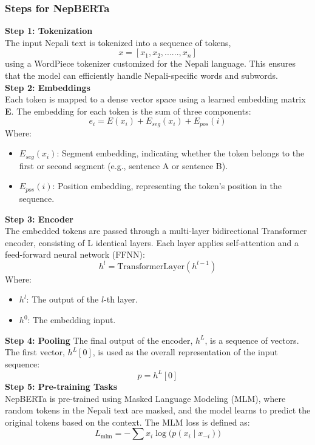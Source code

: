 \subsubsection{Steps for NepBERTa}
\textbf{Step 1: Tokenization}\\
The input Nepali text is tokenized into a sequence of tokens,\begin{equation}
x = [x_1, x_2,......, x_n]
\end{equation}
using a WordPiece tokenizer customized for the Nepali language. This ensures that the model can efficiently handle Nepali-specific words and subwords.\\
\textbf{Step 2: Embeddings}\\
Each token is mapped to a dense vector space using a learned embedding matrix \textbf{E}. The embedding for each token is the sum of three components:
\begin{equation}
e_i = E(x_i) + E_{seg}(x_i) + E_{pos}(i)
\end{equation}
Where:\begin{itemize}
\item \(E_{seg}(x_i)\): Segment embedding, indicating whether the token belongs to the first or second segment (e.g., sentence A or sentence B).
\item \( E_{pos}(i)\): Position embedding, representing the token's position in the sequence.
\end{itemize}
\textbf{Step 3: Encoder}\\
The embedded tokens are passed through a multi-layer bidirectional Transformer encoder, consisting of L identical layers. Each layer applies self-attention and a feed-forward neural network (FFNN):
\begin{equation}
h^l = \text{TransformerLayer}(h^{l-1})
\end{equation}
Where:
\begin{itemize}
    \item \( h^l \): The output of the \( l \)-th layer.
    \item \( h^0 \): The embedding input.
\end{itemize}
\textbf{Step 4: Pooling}
The final output of the encoder, \( h^L \), is a sequence of vectors. The first vector, \( h^L[0] \), is used as the overall representation of the input sequence:
\begin{equation}
p = h^L[0]
\end{equation}
\textbf{Step 5: Pre-training Tasks}\\
NepBERTa is pre-trained using Masked Language Modeling (MLM), where random tokens in the Nepali text are masked, and the model learns to predict the original tokens based on the context. The MLM loss is defined as:
\begin{equation}
L_{\text{mlm}} = -\sum x_i \log\big(p(x_i \mid x_{-i})\big)
\end{equation}

